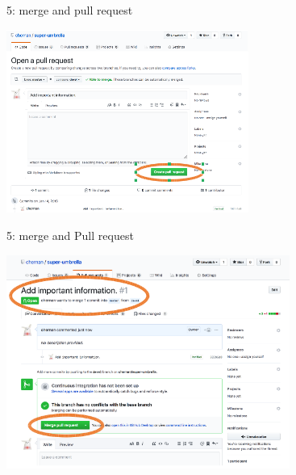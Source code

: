 \begin{frame}{ }
\begin{exampleblock}{5: merge and pull request}
    \begin{center}
    \includegraphics[height=6cm]{05_history/Images/FAIR_githubTP_openMergePR.png}
    \end{center}
\end{exampleblock}
\end{frame}
\begin{frame}{ }
\begin{exampleblock}{5: merge and Pull request}
    \begin{center}
    \includegraphics[height=7cm]{05_history/Images/FAIR_githubTP_mergePR.png}
    \end{center}
\end{exampleblock}
\end{frame}
